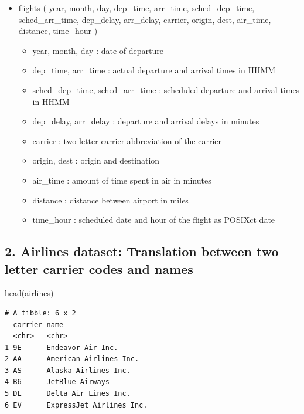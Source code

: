 \documentclass[
  10pt,
  letterpaper,
  DIV=11,
  numbers=noendperiod]{scrartcl}
\newenvironment{Shaded}{\begin{snugshade}}{\end{snugshade}}
\newcommand{\FunctionTok}[1]{\textcolor[rgb]{0.28,0.35,0.67}{#1}}
\newcommand{\NormalTok}[1]{\textcolor[rgb]{0.00,0.23,0.31}{#1}}
\providecommand{\tightlist}{%
  \setlength{\itemsep}{0pt}\setlength{\parskip}{0pt}}\usepackage{longtable,booktabs,array}
\begin{document}
\begin{itemize}
\tightlist
\item
  flights ( year, month, day, dep\_time, arr\_time, sched\_dep\_time,
  sched\_arr\_time, dep\_delay, arr\_delay, carrier, origin, dest,
  air\_time, distance, time\_hour )

  \begin{itemize}
  \tightlist
  \item
    year, month, day : date of departure
  \item
    dep\_time, arr\_time : actual departure and arrival times in HHMM
  \item
    sched\_dep\_time, sched\_arr\_time : scheduled departure and arrival
    times in HHMM
  \item
    dep\_delay, arr\_delay : departure and arrival delays in minutes
  \item
    carrier : two letter carrier abbreviation of the carrier
  \item
    origin, dest : origin and destination
  \item
    air\_time : amount of time spent in air in minutes
  \item
    distance : distance between airport in miles
  \item
    time\_hour : scheduled date and hour of the flight as POSIXct date
  \end{itemize}
\end{itemize}

\subsection{2. Airlines dataset: Translation between two letter carrier
codes and
names}\label{airlines-dataset-translation-between-two-letter-carrier-codes-and-names}

\begin{Shaded}
\begin{Highlighting}[numbers=left,,]
\FunctionTok{head}\NormalTok{(airlines)}
\end{Highlighting}
\end{Shaded}

\begin{verbatim}
# A tibble: 6 x 2
  carrier name                    
  <chr>   <chr>                   
1 9E      Endeavor Air Inc.       
2 AA      American Airlines Inc.  
3 AS      Alaska Airlines Inc.    
4 B6      JetBlue Airways         
5 DL      Delta Air Lines Inc.    
6 EV      ExpressJet Airlines Inc.
\end{verbatim}
\end{document}
